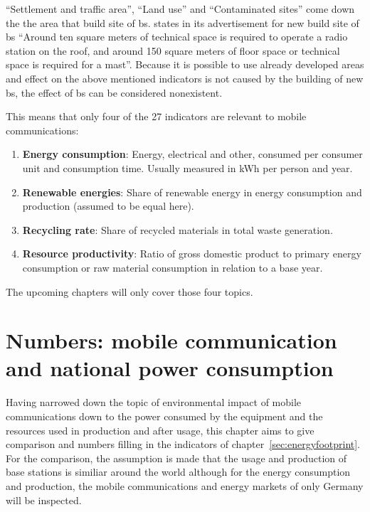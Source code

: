 \documentclass[11pt,a4paper]{article}
\begin{document}
\enquote{Settlement and traffic area}, \enquote{Land use} and \enquote{Contaminated sites} come down the the area that build site of  \acrshort{bs}.
\citep{BSStandort} states in its advertisement for new build site of \acrshort{bs} \enquote{Around ten square meters of technical space is required to operate a radio station on the roof, and around 150 square meters of floor space or technical space is required for a mast}.
Because it is possible to use already developed areas and effect on the above mentioned indicators is not caused by the building of new \acrshort{bs}, the effect of \acrshort{bs} can be considered nonexistent.

This means that only four of the 27 indicators are relevant to mobile communications:
\begin{enumerate}
  \item \textbf{Energy consumption}: Energy, electrical and other, consumed per consumer unit and consumption time. Usually measured in kWh per person and year.
  \item \textbf{Renewable energies}: Share of renewable energy in energy consumption and production (assumed to be equal here).
  \item \textbf{Recycling rate}: Share of recycled materials in total waste generation.
  \item \textbf{Resource productivity}: Ratio of gross domestic product to primary energy consumption or raw material consumption in relation to a base year.
\end{enumerate}

The upcoming chapters will only cover those four topics.

\section{Numbers: mobile communication and national power consumption}\label{sec:influence}

Having narrowed down the topic of environmental impact of mobile communications down to the power consumed by the equipment and the resources used in production and after usage, this chapter aims to give comparison and numbers filling in the indicators of chapter~\ref{sec:energyfootprint}.
For the comparison, the assumption is made that the usage and production of base stations is similiar around the world although for the energy consumption and production, the mobile communications and energy markets of only Germany will be inspected. 
\end{document}
